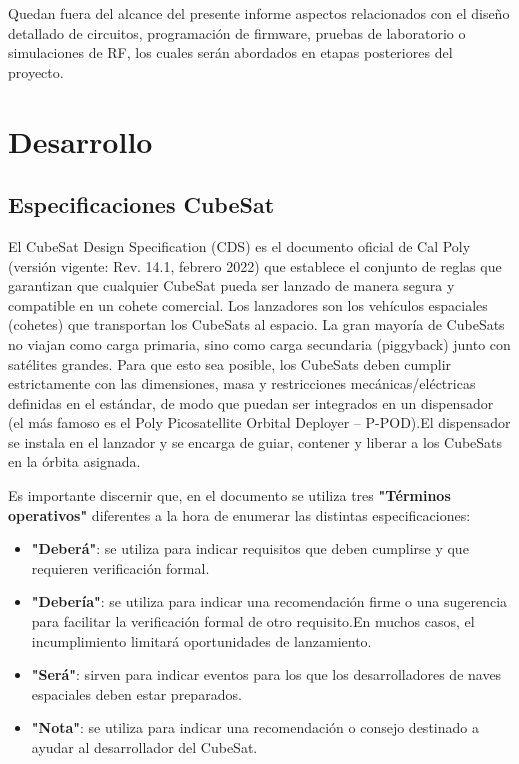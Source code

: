 \documentclass[12pt]{article}
\begin{document}
		Quedan fuera del alcance del presente informe aspectos relacionados con el diseño detallado de circuitos, programación de firmware, pruebas de laboratorio o simulaciones de RF, los cuales serán abordados en etapas posteriores del proyecto.
		
	\section{Desarrollo}
	\subsection{Especificaciones CubeSat}
	El CubeSat Design Specification (CDS) es el documento oficial de Cal Poly \cite{CDS2022} (versión vigente: Rev. 14.1, febrero 2022) que establece el conjunto de reglas que garantizan que cualquier CubeSat pueda ser lanzado de manera segura y compatible en un cohete comercial.
	Los lanzadores son los vehículos espaciales (cohetes) que transportan los CubeSats al espacio. La gran mayoría de CubeSats no viajan como carga primaria, sino como carga secundaria (piggyback) junto con satélites grandes.
	Para que esto sea posible, los CubeSats deben cumplir estrictamente con las dimensiones, masa y restricciones mecánicas/eléctricas definidas en el estándar, de modo que puedan ser integrados en un dispensador (el más famoso es el Poly Picosatellite Orbital Deployer – P-POD).El dispensador se instala en el lanzador y se encarga de guiar, contener y liberar a los CubeSats en la órbita asignada.
	
	Es importante discernir que, en el documento se utiliza tres \textbf{"Términos operativos"} diferentes a la hora de enumerar las distintas especificaciones:
	
	\begin{itemize}
		\item \textbf{"Deberá"}: se utiliza para indicar requisitos que deben cumplirse y que requieren verificación formal.
		
		\item \textbf{"Debería"}: se utiliza para indicar una recomendación firme o una sugerencia para facilitar la verificación formal de otro requisito.En muchos casos, el incumplimiento limitará oportunidades de lanzamiento.
		
		\item \textbf{"Será"}: sirven para indicar eventos para los que los desarrolladores de naves espaciales deben estar preparados.
		
		\item \textbf{"Nota"}: se utiliza para indicar una recomendación o consejo destinado a ayudar al desarrollador del CubeSat.
	\end{itemize}
	
\end{document}
